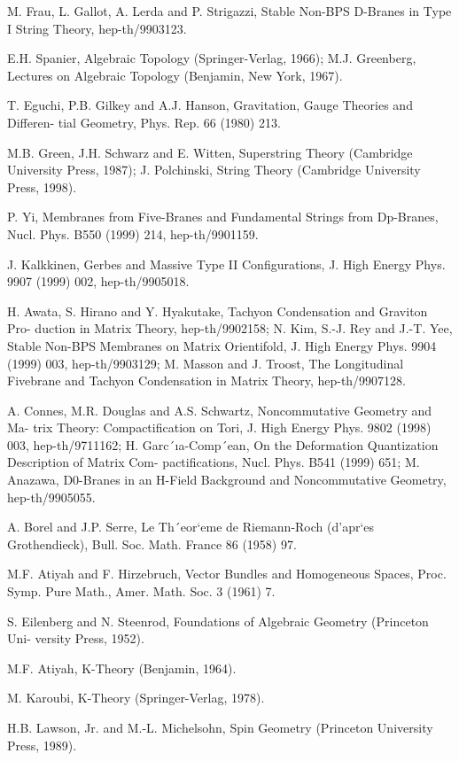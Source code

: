 \documentclass[11pt,a4paper]{ctexart}
\begin{document}
\begin{enumerate}[label={[\arabic*]},leftmargin=*,itemsep=2pt]
\item M. Frau, L. Gallot, A. Lerda and P. Strigazzi, Stable Non-BPS D-Branes in Type I String Theory, hep-th/9903123.
\item E.H. Spanier, Algebraic Topology (Springer-Verlag, 1966); M.J. Greenberg, Lectures on Algebraic Topology (Benjamin, New York, 1967).
\item T. Eguchi, P.B. Gilkey and A.J. Hanson, Gravitation, Gauge Theories and Differen- tial Geometry, Phys. Rep. 66 (1980) 213.
\item M.B. Green, J.H. Schwarz and E. Witten, Superstring Theory (Cambridge University Press, 1987); J. Polchinski, String Theory (Cambridge University Press, 1998).
\item P. Yi, Membranes from Five-Branes and Fundamental Strings from Dp-Branes, Nucl. Phys. B550 (1999) 214, hep-th/9901159.
\item J. Kalkkinen, Gerbes and Massive Type II Configurations, J. High Energy Phys. 9907 (1999) 002, hep-th/9905018.
\item H. Awata, S. Hirano and Y. Hyakutake, Tachyon Condensation and Graviton Pro- duction in Matrix Theory, hep-th/9902158; N. Kim, S.-J. Rey and J.-T. Yee, Stable Non-BPS Membranes on Matrix Orientifold, J. High Energy Phys. 9904 (1999) 003, hep-th/9903129; M. Masson and J. Troost, The Longitudinal Fivebrane and Tachyon Condensation in Matrix Theory, hep-th/9907128.
\item A. Connes, M.R. Douglas and A.S. Schwartz, Noncommutative Geometry and Ma- trix Theory: Compactification on Tori, J. High Energy Phys. 9802 (1998) 003, hep-th/9711162; H. Garc´ıa-Comp´ean, On the Deformation Quantization Description of Matrix Com- pactifications, Nucl. Phys. B541 (1999) 651; M. Anazawa, D0-Branes in an H-Field Background and Noncommutative Geometry, hep-th/9905055.
\item A. Borel and J.P. Serre, Le Th´eor`eme de Riemann-Roch (d’apr`es Grothendieck), Bull. Soc. Math. France 86 (1958) 97.
\item M.F. Atiyah and F. Hirzebruch, Vector Bundles and Homogeneous Spaces, Proc. Symp. Pure Math., Amer. Math. Soc. 3 (1961) 7.
\item S. Eilenberg and N. Steenrod, Foundations of Algebraic Geometry (Princeton Uni- versity Press, 1952).
\item M.F. Atiyah, K-Theory (Benjamin, 1964).
\item M. Karoubi, K-Theory (Springer-Verlag, 1978).
\item H.B. Lawson, Jr. and M.-L. Michelsohn, Spin Geometry (Princeton University Press, 1989).

\end{enumerate}
\end{document}
